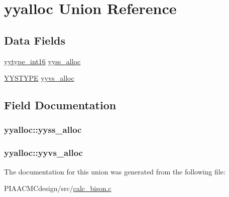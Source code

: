 \hypertarget{unionyyalloc}{\section{yyalloc Union Reference}
\label{unionyyalloc}
}
\subsection*{Data Fields}
\begin{DoxyCompactItemize}
\item 
\hyperlink{PIAACMCdesign_2src_2calc__bison_8c_ade5b97f0021a4f6c5922ead3744ab297}{yytype\+\_\+int16} \hyperlink{unionyyalloc_a4800e0520a89a4789afa7b5d82197e65}{yyss\+\_\+alloc}
\item 
\hyperlink{unionYYSTYPE}{Y\+Y\+S\+T\+Y\+P\+E} \hyperlink{unionyyalloc_a9326f4fdc6f737a929444427836d8928}{yyvs\+\_\+alloc}
\end{DoxyCompactItemize}


\subsection{Field Documentation}
\hypertarget{unionyyalloc_a4800e0520a89a4789afa7b5d82197e65}{
\subsubsection[{yyss\+\_\+alloc}]{ yyalloc\+::yyss\+\_\+alloc}}\label{unionyyalloc_a4800e0520a89a4789afa7b5d82197e65}
\hypertarget{unionyyalloc_a9326f4fdc6f737a929444427836d8928}{
\subsubsection[{yyvs\+\_\+alloc}]{ yyalloc\+::yyvs\+\_\+alloc}}\label{unionyyalloc_a9326f4fdc6f737a929444427836d8928}


The documentation for this union was generated from the following file\+:\begin{DoxyCompactItemize}
\item 
P\+I\+A\+A\+C\+M\+Cdesign/src/\hyperlink{PIAACMCdesign_2src_2calc__bison_8c}{calc\+\_\+bison.\+c}\end{DoxyCompactItemize}
